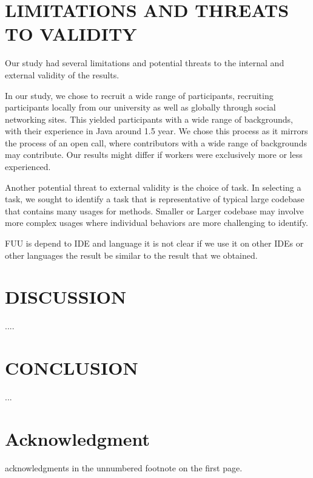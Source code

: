 \documentclass[conference]{IEEEtran}
\begin{document}
\section{LIMITATIONS AND THREATS TO VALIDITY}
Our study had several limitations and potential threats to the internal and external validity of the results. \par  

In our study, we chose to recruit a wide range of participants, recruiting participants locally from our university as well as globally through social networking sites. This yielded participants with a wide range of backgrounds, with their experience in Java around 1.5 year. We chose this process as it mirrors the process of an open call, where contributors with a wide range of backgrounds may contribute. Our results might differ if workers were exclusively more or less experienced. \par

Another potential threat to external validity is the choice of task. In selecting a task, we sought to identify a task that is representative of typical large codebase that contains many usages for methods. Smaller or Larger codebase may involve more complex usages where individual behaviors are more challenging to identify. \par 

FUU is depend to IDE and language it is not clear if we use it on other IDEs or other languages the result be similar to the result that we obtained.

\par

\section{DISCUSSION}
....

\section{CONCLUSION}
...


\section*{Acknowledgment}

acknowledgments in the unnumbered footnote on the first page.



\end{document}
